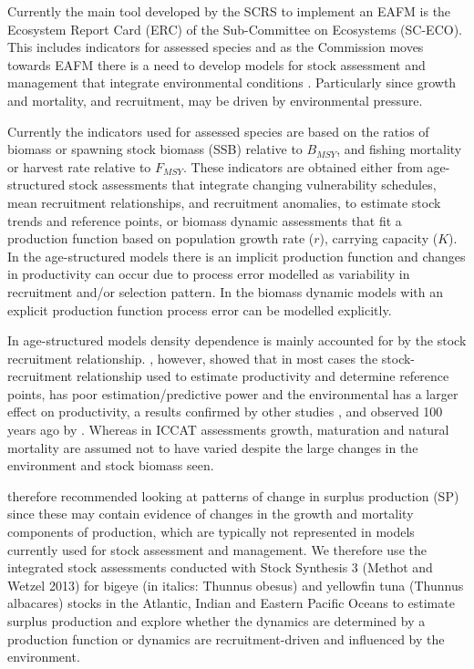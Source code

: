 \documentclass[12pt,doublespacing,a4paper]{ouparticle}
\begin{document}
Currently the main tool developed by the SCRS to implement an EAFM is the Ecosystem Report Card (ERC) of the Sub-Committee on Ecosystems (SC-ECO). This includes indicators for assessed species and as the Commission moves towards EAFM there is a need to develop models for stock assessment and management that integrate environmental conditions \citep{travis2014integrating}.  Particularly since growth and mortality, and recruitment, may be driven by environmental pressure.

Currently the indicators used for assessed species are based on the ratios of biomass or spawning stock biomass (SSB) relative to $B_{MSY}$, and fishing mortality or harvest rate relative to $F_{MSY}$. These indicators are obtained either from age-structured stock assessments that integrate changing vulnerability schedules, mean recruitment relationships, and recruitment anomalies, to estimate stock trends and reference points, or biomass dynamic assessments that fit a production function based on population growth rate ($r$), carrying capacity ($K$). In the age-structured models there is an implicit production function and changes in productivity can occur due to process error modelled as variability in recruitment and/or selection pattern. In the biomass dynamic models with an explicit production function process error can be modelled explicitly.  

In age-structured models density dependence is mainly accounted for by the stock recruitment relationship. \cite{cury2014resolving}, however, showed that in most cases the stock-recruitment relationship used to estimate productivity and determine reference points, has poor estimation/predictive power and the environmental has a larger effect on productivity, a results confirmed by other studies \citep[e.g.][]{szuwalski2015examining, szuwalski2019global,Free2019}, and observed 100 years ago by \cite{hjort1914fluctuations}. Whereas in ICCAT assessments growth, maturation and natural mortality are assumed not to have varied despite the large changes in the environment and stock biomass seen.

\cite{hilborn2001calculation} therefore recommended looking at patterns of change in surplus production (SP) since these may contain evidence of changes in the growth and mortality components of production, which are typically not represented in models currently used for stock assessment and management. 
We therefore use the integrated stock assessments conducted with Stock Synthesis 3 (Methot and Wetzel 2013) \cite[SS3]{methot2005technical} for bigeye (in italics: Thunnus obesus) and yellowfin tuna (Thunnus albacares) stocks in the Atlantic, Indian and Eastern Pacific Oceans to estimate surplus production and explore whether the dynamics are determined by a production function or dynamics are recruitment-driven and influenced by the environment.
\end{document}
